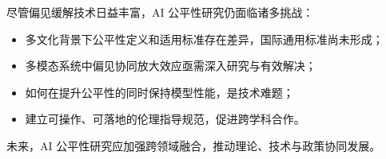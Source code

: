 
尽管偏见缓解技术日益丰富，AI 公平性研究仍面临诸多挑战：

\begin{itemize}
	\item 多文化背景下公平性定义和适用标准存在差异，国际通用标准尚未形成；
	\item 多模态系统中偏见协同放大效应亟需深入研究与有效解决；
	\item 如何在提升公平性的同时保持模型性能，是技术难题；
	\item 建立可操作、可落地的伦理指导规范，促进跨学科合作。
\end{itemize}

未来，AI 公平性研究应加强跨领域融合，推动理论、技术与政策协同发展。
